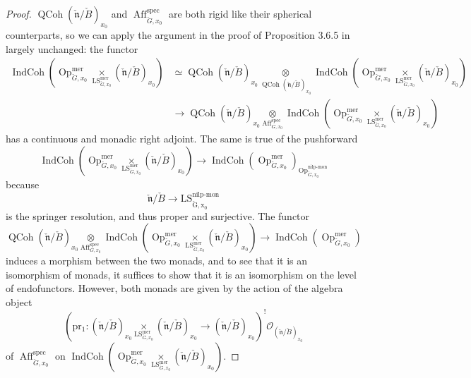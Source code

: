 \documentclass[10pt]{amsart}
\theoremstyle{remark}
\newcommand{\on}[1]{\operatorname{#1}}
\newcommand{\QCoh}{\on{QCoh}}
\newcommand{\IndCoh}{\on{IndCoh}}
\newcommand{\Gcheck}{\check{G}}
\newcommand{\ncheck}{\check{\mathfrak{n}}}
\newcommand{\Bcheck}{\check{B}}
\begin{document}
\begin{proof}
    $\QCoh(\ncheck/\Bcheck)_{x_0}$ and $\on{Aff}_{\Gcheck, x_0}^{\on{spec}}$ are both rigid like their spherical counterparts, so we can apply the argument in the proof of Proposition 3.6.5 in \cite{GLC2} largely unchanged: the functor
    \begin{align}
    \IndCoh(\on{Op}_{\Gcheck, x_0}^{\on{mer}} \underset{\on{LS}_{\Gcheck, x_0}^{\on{mer}}}{\times} (\ncheck/\Bcheck)_{x_0}) &\simeq \QCoh(\ncheck/\Bcheck)_{x_0} \underset{\QCoh(\ncheck/\Bcheck)_{x_0}}{\otimes} \IndCoh(\on{Op}_{\Gcheck, x_0}^{\on{mer}} \underset{\on{LS}_{\Gcheck, x_0}^{\on{mer}}}{\times} (\ncheck/\Bcheck)_{x_0}) \\ &\to \QCoh(\ncheck/\Bcheck)_{x_0} \underset{\on{Aff}_{G, x_0}^{\on{spec}}}{\otimes} \IndCoh(\on{Op}_{\Gcheck, x_0}^{\on{mer}} \underset{\on{LS}_{\Gcheck, x_0}^{\on{mer}}}{\times} (\ncheck/\Bcheck)_{x_0})
    \end{align}
    has a continuous and monadic right adjoint. The same is true of the pushforward
    $$
    \IndCoh(\on{Op}_{\Gcheck, x_0}^{\on{mer}} \underset{\on{LS}_{\Gcheck, x_0}^{\on{mer}}}{\times} (\ncheck/\Bcheck)_{x_0}) \to \IndCoh(\on{Op}_{\Gcheck, x_0}^{\on{mer}})_{\on{Op}_{\Gcheck, x_0}^{\on{nilp-mon}}}
    $$
    because
    $$
    \ncheck/\Bcheck \to \on{LS_{\Gcheck, x_0}^{\on{nilp-mon}}}
    $$
    is the springer resolution, and thus proper and surjective. The functor
    $$
    \QCoh(\ncheck/\Bcheck)_{x_0} \underset{\on{Aff}_{G, x_0}^{\on{spec}}}{\otimes} \IndCoh(\on{Op}_{\Gcheck, x_0}^{\on{mer}} \underset{\on{LS}_{\Gcheck, x_0}^{\on{mer}}}{\times} (\ncheck/\Bcheck)_{x_0}) \longrightarrow 
    \IndCoh(\on{Op}_{\Gcheck, x_0}^{\on{mer}})
    $$
    induces a morphism between the two monads, and to see that it is an isomorphism of monads, it suffices to show that it is an isomorphism on the level of endofunctors. However, both monads are given by the action of the algebra object
    $$
    (\on{pr_1} : (\ncheck/\Bcheck)_{x_0} \underset{\on{LS}_{\Gcheck, x_0}^{\on{mer}}}{\times} (\ncheck/\Bcheck)_{x_0} \to (\ncheck/\Bcheck)_{x_0})^! \mathcal{O}_{(\ncheck/\Bcheck)_{x_0}}
    $$
    of $\on{Aff}_{\Gcheck, x_0}^{\on{spec}}$ on $\IndCoh(\on{Op}_{\Gcheck, x_0}^{\on{mer}} \underset{\on{LS}_{\Gcheck, x_0}^{\on{mer}}}{\times} (\ncheck/\Bcheck)_{x_0})$.
\end{proof}
\end{document}
